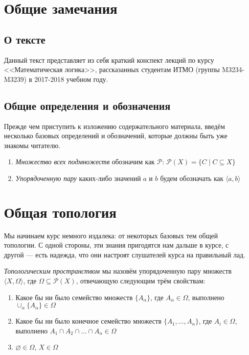 \section{Общие замечания}

\subsection{О тексте}

Данный текст представляет из себя краткий конспект лекций по курсу
<<Математическая логика>>, рассказанных студентам ИТМО (группы M3234-M3239)
в 2017-2018 учебном году.

\subsection{Общие определения и обозначения}

Прежде чем приступить к изложению содержательного материала, введём несколько
базовых определений и обозначений, которые должны быть уже знакомы читателю.

\begin{enumerate}
\item \emph{Множество всех подмножеств} обозначим как $\mathcal{P}$:
$\mathcal{P}(X) = \{ C \mid C \subseteq X \}$

\item \emph{Упорядоченную пару} каких-либо значений $a$ и $b$ 
будем обозначать как $\langle a, b \rangle$

\end{enumerate}

\section{Общая топология}

Мы начинаем курс немного издалека: от некоторых базовых тем общей топологии.
С одной стороны, эти знания пригодятся нам дальше в курсе, с другой --- есть 
надежда, что они настроят слушателей курса на правильный лад.

\begin{definition} \emph{Топологическим пространством} мы назовём упорядоченную
пару множеств $\langle X, \Omega \rangle$, где $\Omega \subseteq {\mathcal{P}}(X)$,
отвечающую следующим трём свойствам:

\begin{enumerate}
\item Какое бы ни было семейство множеств $\{A_\alpha\}$, где $A_\alpha \in \Omega$, выполнено
$\cup_\alpha\{A_\alpha\} \in \Omega$
\item Какое бы ни было конечное семейство множеств $\{A_1, \dots, A_n\}$, где $A_i \in \Omega$,
выполнено $A_1 \cap A_2 \cap \dots \cap A_n \in \Omega$
\item $\varnothing \in \Omega$, $X \in \Omega$
\end{enumerate}
\end{definition}

